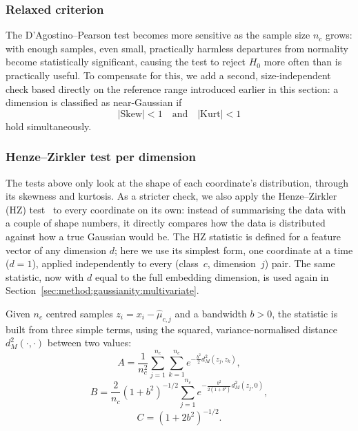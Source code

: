 \subsubsection{Relaxed criterion}
The D'Agostino--Pearson test becomes more sensitive as the sample size $n_c$ grows: with enough samples, even small, practically harmless departures from normality become statistically significant, causing the test to reject $H_0$ more often than is practically useful. To compensate for this, we add a second, size-independent check based directly on the reference range introduced earlier in this section: a dimension is classified as near-Gaussian if
\begin{equation}
	|\mathrm{Skew}| < 1 \quad \text{and} \quad |\mathrm{Kurt}| < 1
\end{equation}
hold simultaneously. 

\subsubsection{Henze--Zirkler test per dimension}
\label{sec:method:gaussianity:hz_univariate}
The tests above only look at the shape of each coordinate's distribution, through its skewness and kurtosis. As a stricter check, we also apply the Henze--Zirkler (HZ) test~\cite{henze1990class} to every coordinate on its own: instead of summarising the data with a couple of shape numbers, it directly compares how the data is distributed against how a true Gaussian would be. The HZ statistic is defined for a feature vector of any dimension $d$; here we use its simplest form, one coordinate at a time ($d=1$), applied independently to every (class~$c$, dimension~$j$) pair. The same statistic, now with $d$ equal to the full embedding dimension, is used again in Section~\ref{sec:method:gaussianity:multivariate}.

Given $n_c$ centred samples $z_i = x_i - \hat{\mu}_{c,j}$ and a bandwidth $b>0$, the statistic is built from three simple terms, using the squared, variance-normalised distance $d_M^2(\cdot,\cdot)$ between two values:
\begin{equation}
	A = \frac{1}{n_c^2} \sum_{j=1}^{n_c} \sum_{k=1}^{n_c} e^{-\frac{b^2}{2}d_M^2(z_j, z_k)},
\end{equation}
\begin{equation}
	B = \frac{2}{n_c}(1+b^2)^{-1/2} \sum_{j=1}^{n_c} e^{-\frac{b^2}{2(1+b^2)}d_M^2(z_j, 0)},
\end{equation}
\begin{equation}
	C = (1+2b^2)^{-1/2}.
\end{equation}

